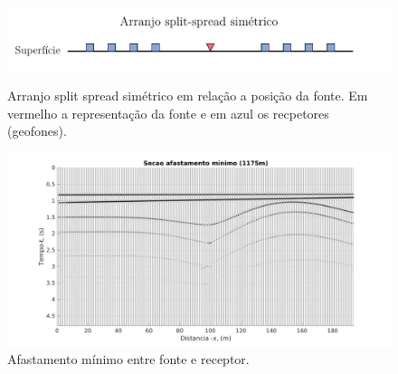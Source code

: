 \begin{figure}[H]
\centering
\includegraphics[height=2.5cm]{figuras/cap2/split_spread.pdf}
\caption{Arranjo split spread simétrico em relação a posição da fonte. Em vermelho a representação da fonte e em azul os recpetores (geofones).}
\label{fig:split_spread}
\end{figure}

\begin{landscape}
\begin{figure}[H]
\centering
\includegraphics[totalheight=14cm]{figuras/cap2/wigb_plot.pdf}
\caption{Afastamento mínimo entre fonte e receptor.}
\label{fig:afastamento_min}
\end{figure}
\end{landscape}
